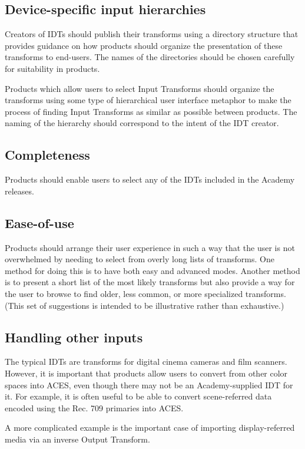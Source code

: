 \subsection{Device-specific input hierarchies}
Creators of IDTs should publish their transforms using a directory structure that provides guidance on how products should organize the presentation of these transforms to end-users. The names of the directories should be chosen carefully for suitability in products.

Products which allow users to select Input Transforms should organize the transforms using some type of hierarchical user interface metaphor to make the process of finding Input Transforms as similar as possible between products. The naming of the hierarchy should correspond to the intent of the IDT creator.

\subsection{Completeness}
Products should enable users to select any of the IDTs included in the Academy releases.

\subsection{Ease-of-use}
Products should arrange their user experience in such a way that the user is not overwhelmed by needing to select from overly long lists of transforms. One method for doing this is to have both easy and advanced modes. Another method is to present a short list of the most likely transforms but also provide a way for the user to browse to find older, less common, or more specialized transforms. (This set of suggestions is intended to be illustrative rather than exhaustive.)

\subsection{Handling other inputs}
The typical IDTs are transforms for digital cinema cameras and film scanners. However, it is important that products allow users to convert from other color spaces into ACES, even though there may not be an Academy-supplied IDT for it. For example, it is often useful to be able to convert scene-referred data encoded using the Rec. 709 primaries into ACES.

A more complicated example is the important case of importing display-referred media via an inverse Output Transform.
